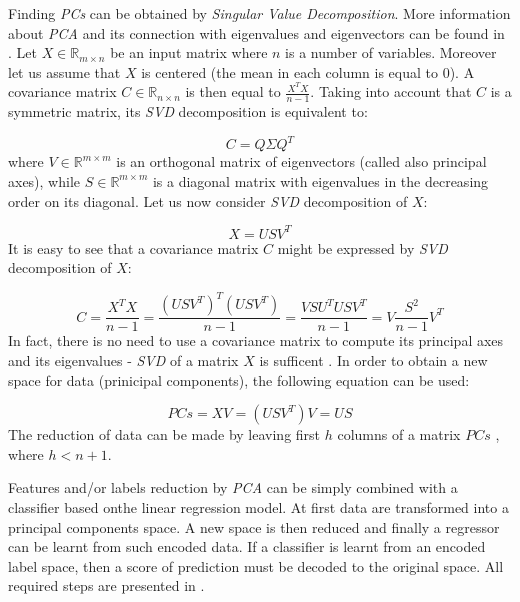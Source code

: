 Finding \textit{PCs} can be obtained by \textit{Singular Value Decomposition}. More information about \textit{PCA} and its connection with eigenvalues and eigenvectors can be found in . Let $X \in \mathbb{R}_{m \times n}$ be an input matrix where $n$ is a number of variables. Moreover let us assume that $X$ is centered (the mean in each column is equal to $0$). A covariance matrix $C \in \mathbb{R}_{n \times n}$ is then equal to $\frac{X^TX}{n-1}$. Taking into account that $C$ is a symmetric matrix, its \textit{SVD} decomposition is equivalent to:

\begin{equation}\label{eq:pca1}
    C=Q\Sigma{Q^T}
\end{equation}
where $V \in \mathbb{R}^{m \times m}$ is an orthogonal matrix of eigenvectors (called also principal axes), while $S \in \mathbb{R}^{m \times m}$ is a diagonal matrix with eigenvalues in the decreasing order on its diagonal. 
Let us now consider \textit{SVD} decomposition of $X$:

\begin{equation}\label{eq:pca2}
    X=USV^{T}
\end{equation}
It is easy to see that a covariance matrix $C$ might be expressed by \textit{SVD} decomposition of $X$:

\begin{equation}\label{eq:pca3}
    C=\frac{X^TX}{n-1} = \frac{(USV^T)^T(USV^T)}{n-1} = \frac{VSU^TUSV^T}{n-1} = V\frac{S^{2}}{n-1}V^{T} 
\end{equation}
In fact, there is no need to use a covariance matrix to compute its principal axes and its eigenvalues - \textit{SVD} of a matrix $X$ is sufficent \cite{Jolliffe}. In order to obtain a new space for data (prinicipal components), the following equation can be used:

\begin{equation}\label{eq:pca4}
    PCs = XV = (USV^{T})V = US
\end{equation}
The reduction of data can be made by leaving first $h$ columns of a matrix $PCs$ , where $h<n+1$.

Features and/or labels reduction by \textit{PCA} can be simply combined with a classifier based onthe linear regression model. At first data are transformed into a principal components space. A new space is then reduced and finally a regressor can be learnt from such encoded data. If a classifier is learnt from an encoded label space, then a score of prediction must be decoded to the original space. All required steps are presented in .

